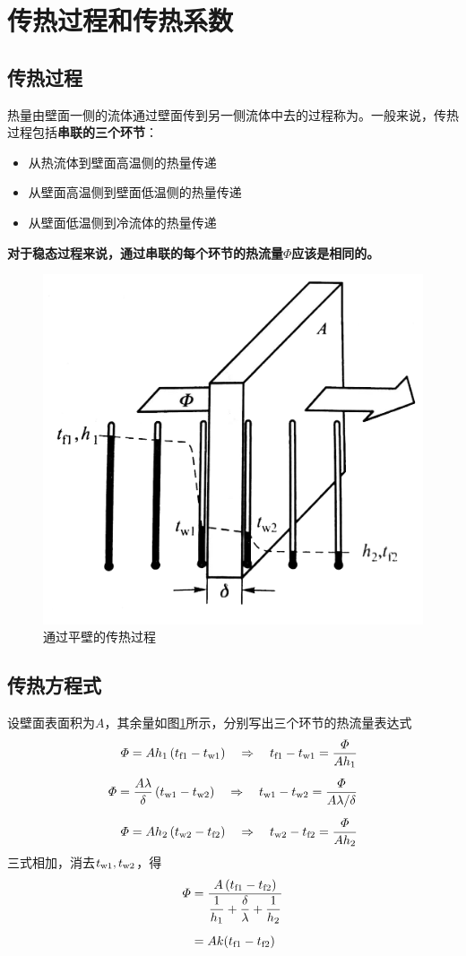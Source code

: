 \section{传热过程和传热系数}
\subsection{传热过程}
\tdefination[传热过程]
热量由壁面一侧的流体通过壁面传到另一侧流体中去的过程称为。一般来说，传热过程包括\textbf{串联的三个环节}：
\begin{itemize}
	\item 从热流体到壁面高温侧的热量传递
	\item 从壁面高温侧到壁面低温侧的热量传递
	\item 从壁面低温侧到冷流体的热量传递
\end{itemize}

\textbf{对于稳态过程来说，通过串联的每个环节的热流量$\bm{\varPhi}$应该是相同的。}
\begin{figure}[!htb]
	\centering
	\includegraphics[width=0.4\linewidth]{pic/传热方程.jpeg}
	\vspace*{-1.5em}
	\caption{通过平壁的传热过程}
	\label{传热方程}
\end{figure}

\subsection{传热方程式}
设壁面表面积为$A$，其余量如图\ref{传热方程}所示，分别写出三个环节的热流量表达式
\begin{align*}
	\varPhi = Ah_1\left(t_{\text{f} 1} - t_{\text{w} 1}\right) \quad \Rightarrow \quad t_{\text{f} 1} - t_{\text{w} 1} = \dfrac{\varPhi}{Ah_1}\\[0.5em]
	\varPhi = \dfrac{A \lambda}{\delta}\left(t_{\text{w} 1}- t_{\text{w} 2}\right) \quad \Rightarrow \quad t_{\text{w} 1}- t_{\text{w} 2} = \dfrac{\varPhi}{A\lambda / \delta}\\[0.5em]
	\varPhi = Ah_2\left(t_{\text{w} 2} - t_{\text{f} 2}\right) \quad \Rightarrow \quad t_{\text{w} 2} - t_{\text{f} 2} = \dfrac{\varPhi}{Ah_2}
\end{align*}
三式相加，消去$t_{\text{w} 1},t_{\text{w} 2}$，得
\begin{align}
	\varPhi &= \dfrac{A\left(t_{\text{f} 1} -t_{\text{f} 2}\right)}{\dfrac{1}{h_1} + \dfrac{\delta }{\lambda} + \dfrac{1}{h_2}} \label{传热方程式0}\\[0.5em]
	& = Ak(t_{\text{f} 1} - t_{\text{f} 2})
	\label{传热方程式}
\end{align}

